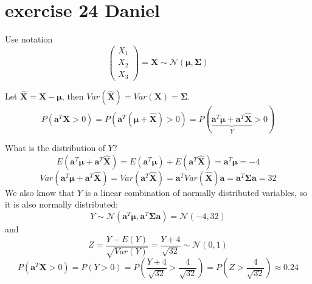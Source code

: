 \documentclass{article}
\let\normalmu\mu
\let\normalSigma\Sigma
\renewcommand{\mu}{\bm{\normalmu}} %
\renewcommand{\Sigma}{\bm{\normalSigma}} %
\begin{document}
\section{exercise 24 Daniel}
Use notation
\[\left( {\begin{array}{*{20}{c}}
            {{X_1}} \\
            {{X_2}} \\
            {{X_3}}
        \end{array}} \right) = {\mathbf{X}}\sim\mathcal{N}\left( {{\mathbf{\mu }},{\mathbf{\Sigma }}} \right)\]

Let ${\mathbf{\hat X}} = {\mathbf{X}} - {\mathbf{\mu }}$,
then $Var\left( {{\mathbf{\hat X}}} \right) = Var\left( {\mathbf{X}} \right) = {\mathbf{\Sigma }}$.
\[P\left( {{{\mathbf{a}}^T}{\mathbf{X}} > 0} \right) = P\left( {{{\mathbf{a}}^T}\left( {{\mathbf{\mu }} + {\mathbf{\hat X}}} \right) > 0} \right) = P\left( {\underbrace {{{\mathbf{a}}^T}{\mathbf{\mu }} + {{\mathbf{a}}^T}{\mathbf{\hat X}}}_Y} > 0 \right)\]

What is the distribution of $Y$?
\[E\left( {{{\mathbf{a}}^T}{\mathbf{\mu }} + {{\mathbf{a}}^T}{\mathbf{\hat X}}} \right) = E\left( {{{\mathbf{a}}^T}{\mathbf{\mu }}} \right) + E\left( {{{\mathbf{a}}^T}{\mathbf{\hat X}}} \right) = {{\mathbf{a}}^T}{\mathbf{\mu }} = -4\]
\[Var\left( {{{\mathbf{a}}^T}{\mathbf{\mu }} + {{\mathbf{a}}^T}{\mathbf{\hat X}}} \right) = Var\left( {{{\mathbf{a}}^T}{\mathbf{\hat X}}} \right) = {{\mathbf{a}}^T}Var\left( {{\mathbf{\hat X}}} \right){\mathbf{a}} = {{\mathbf{a}}^T}{\mathbf{\Sigma a}} = 32\]
We also know that $Y$ is a linear combination of normally distributed variables, so it is also normally distributed:
\[Y\sim \mathcal N({{\mathbf{a}}^T}{\mathbf{\mu }}, {{\mathbf{a}}^T}{\mathbf{\Sigma a}}) = \mathcal N(-4, 32)\]
and
\[Z=\frac{Y - E(Y)}{\sqrt{Var(Y)}} = \frac{Y + 4}{\sqrt{32}} \sim \mathcal N(0, 1)\]
\[P\left( {{{\mathbf{a}}^T}{\mathbf{X}} > 0} \right) = P\left( {Y > 0} \right) = P\left( {\frac{{Y + 4}}{{\sqrt {32} }} > \frac{4}{{\sqrt {32} }}} \right) = P\left( {Z > \frac{4}{{\sqrt {32} }}} \right) \approx 0.24\]
\end{document}
